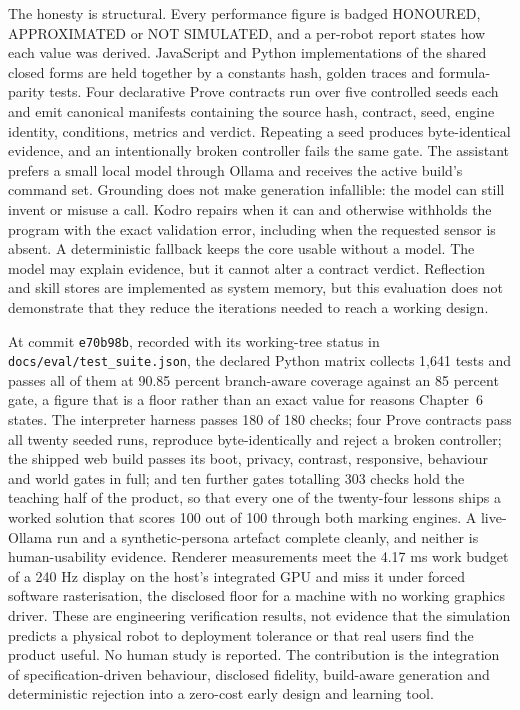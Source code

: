 \documentclass[11pt,a4paper]{report}
\newif\ifhumanfeedback
\begin{document}
The honesty is structural. Every performance figure is badged HONOURED, APPROXIMATED or NOT SIMULATED, and a per-robot report states how each value was derived. JavaScript and Python implementations of the shared closed forms are held together by a constants hash, golden traces and formula-parity tests. Four declarative Prove contracts run over five controlled seeds each and emit canonical manifests containing the source hash, contract, seed, engine identity, conditions, metrics and verdict. Repeating a seed produces byte-identical evidence, and an intentionally broken controller fails the same gate. The assistant prefers a small local model through Ollama and receives the active build's command set. Grounding does not make generation infallible: the model can still invent or misuse a call. Kodro repairs when it can and otherwise withholds the program with the exact validation error, including when the requested sensor is absent. A deterministic fallback keeps the core usable without a model. The model may explain evidence, but it cannot alter a contract verdict. Reflection and skill stores are implemented as system memory, but this evaluation does not demonstrate that they reduce the iterations needed to reach a working design.

At commit \texttt{e70b98b}, recorded with its working-tree status in \texttt{docs/\allowbreak eval/\allowbreak test\_\allowbreak suite.json}, the declared Python matrix collects 1,641 tests and passes all of them at 90.85 percent branch-aware coverage against an 85 percent gate, a figure that is a floor rather than an exact value for reasons Chapter~6 states. The interpreter harness passes 180 of 180 checks; four Prove contracts pass all twenty seeded runs, reproduce byte-identically and reject a broken controller; the shipped web build passes its boot, privacy, contrast, responsive, behaviour and world gates in full; and ten further gates totalling 303 checks hold the teaching half of the product, so that every one of the twenty-four lessons ships a worked solution that scores 100 out of 100 through both marking engines. A live-Ollama run and a synthetic-persona artefact complete cleanly, and neither is human-usability evidence. Renderer measurements meet the 4.17 ms work budget of a 240 Hz display on the host's integrated GPU and miss it under forced software rasterisation, the disclosed floor for a machine with no working graphics driver. These are engineering verification results, not evidence that the simulation predicts a physical robot to deployment tolerance or that real users find the product useful. \ifhumanfeedback No human usability study is reported; a short anonymous volunteer questionnaire is reported as feedback only in Section~\ref{sec:volunteerfeedback}.\else No human study is reported.\fi{} The contribution is the integration of specification-driven behaviour, disclosed fidelity, build-aware generation and deterministic rejection into a zero-cost early design and learning tool.
\end{document}
